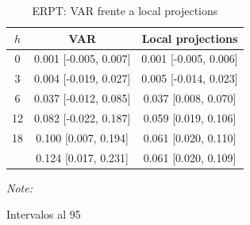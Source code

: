 \begin{table}[!h]
\centering
\caption{ERPT: VAR frente a local projections}
\centering
\begin{threeparttable}
\begin{tabular}[t]{ccc}
\toprule
$h$ & VAR & Local projections\\
\midrule
0 & 0.001 [-0.005, 0.007] & 0.001 [-0.005, 0.006]\\
3 & 0.004 [-0.019, 0.027] & 0.005 [-0.014, 0.023]\\
6 & 0.037 [-0.012, 0.085] & 0.037 [0.008, 0.070]\\
12 & 0.082 [-0.022, 0.187] & 0.059 [0.019, 0.106]\\
18 & 0.100 [0.007, 0.194] & 0.061 [0.020, 0.110]\\
\addlinespace
24 & 0.124 [0.017, 0.231] & 0.061 [0.020, 0.109]\\
\bottomrule
\end{tabular}
\begin{tablenotes}
\item \textit{Note: } 
\item Intervalos al 95%
\end{tablenotes}
\end{threeparttable}
\end{table}